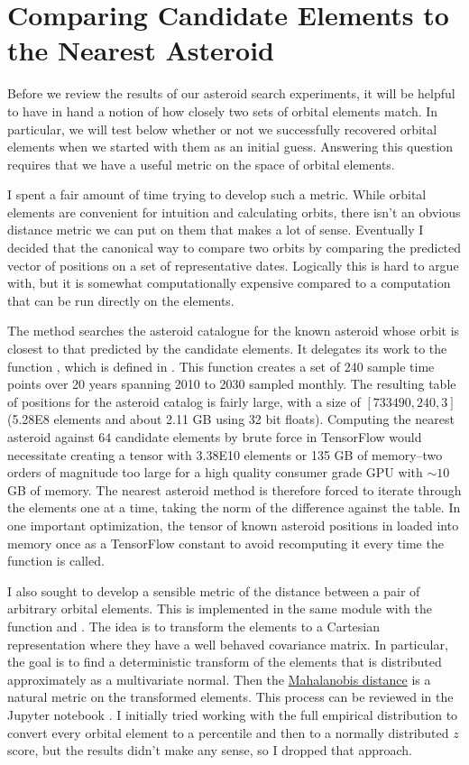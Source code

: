 \section{Comparing Candidate Elements to the Nearest Asteroid}
Before we review the results of our asteroid search experiments, it will be helpful to have in hand a notion of how closely two sets of orbital elements match.
In particular, we will test below whether or not we successfully recovered orbital elements when we started with them as an initial guess.
Answering this question requires that we have a useful metric on the space of orbital elements.

I spent a fair amount of time trying to develop such a metric.
While orbital elements are convenient for intuition and calculating orbits, there isn't an obvious distance metric we can put on them that makes a lot of sense.
Eventually I decided that the canonical way to compare two orbits by comparing the predicted vector of positions on a set of representative dates.
Logically this is hard to argue with, but it is somewhat computationally expensive compared to a computation that can be run directly on the elements.

The method  searches the asteroid catalogue for the known asteroid whose orbit is closest to that predicted by the candidate elements.
It delegates its work to the function , which is defined in .
This function creates a set of 240 sample time points over 20 years spanning 2010 to 2030 sampled monthly.
The resulting table of positions for the asteroid catalog is fairly large, with a size of $[733490, 240, 3]$ (5.28E8 elements and about 2.11 GB using 32 bit floats).
Computing the nearest asteroid against $64$ candidate elements by brute force in TensorFlow would necessitate creating a tensor with 3.38E10 elements
or 135 GB of memory--two orders of magnitude too large for a high quality consumer grade GPU with $\sim 10$ GB of memory.
The nearest asteroid method is therefore forced to iterate through the elements one at a time, taking the norm of the difference against the table.
In one important optimization, the tensor of known asteroid positions in loaded into memory 
once as a TensorFlow constant to avoid recomputing it every time the function is called.

I also sought to develop a sensible metric of the distance between a pair of arbitrary orbital elements.
This is implemented in the same module with the function  and .
The idea is to transform the elements to a Cartesian representation where they have a well behaved covariance matrix.
In particular, the goal is to find a deterministic transform of the elements that is distributed approximately as a multivariate normal.
Then the \href{https://en.wikipedia.org/wiki/Mahalanobis_distance}{Mahalanobis distance} is a natural metric on the transformed elements.
This process can be reviewed in the Jupyter notebook .
I initially tried working with the full empirical distribution to convert every orbital element to a percentile and then to a normally distributed $z$ score,
but the results didn't make any sense, so I dropped that approach.

